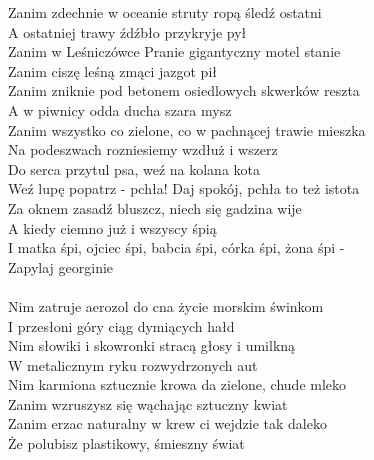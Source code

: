 \documentclass[a5paper, 10pt]{book}
\begin{document}
\begin{minipage}[t]{0.8\textwidth}
  Zanim zdechnie w oceanie struty ropą śledź ostatni\\
  A ostatniej trawy źdźbło przykryje pył\\
  Zanim w Leśniczówce Pranie gigantyczny motel stanie\\
  Zanim ciszę leśną zmąci jazgot pił\\

  Zanim zniknie pod betonem osiedlowych skwerków reszta\\
  A w piwnicy odda ducha szara mysz\\
  Zanim wszystko co zielone, co w pachnącej trawie mieszka\\
  Na podeszwach rozniesiemy wzdłuż i wszerz\\

  \hspace*{5mm}Do serca przytul psa, weź na kolana kota\\
  \hspace*{5mm}Weź lupę popatrz - pchła! Daj spokój, pchła to też istota\\
  \hspace*{5mm}Za oknem zasadź bluszcz, niech się gadzina wije\\
  \hspace*{5mm}A kiedy ciemno już i wszyscy śpią\\
  \hspace*{5mm}I matka śpi, ojciec śpi, babcia śpi, córka śpi, żona śpi -\\
  \hspace*{5mm}Zapylaj georginie\\
  \vspace*{10mm}\\
  Nim zatruje aerozol do cna życie morskim świnkom\\
  I przesłoni góry ciąg dymiących hałd\\
  Nim słowiki i skowronki stracą głosy i umilkną\\
  W metalicznym ryku rozwydrzonych aut\\

  Nim karmiona sztucznie krowa da zielone, chude mleko\\
  Zanim wzruszysz się wąchając sztuczny kwiat\\
  Zanim erzac naturalny w krew ci wejdzie tak daleko\\
  Że polubisz plastikowy, śmieszny świat\\


\end{minipage}
\end{document}
